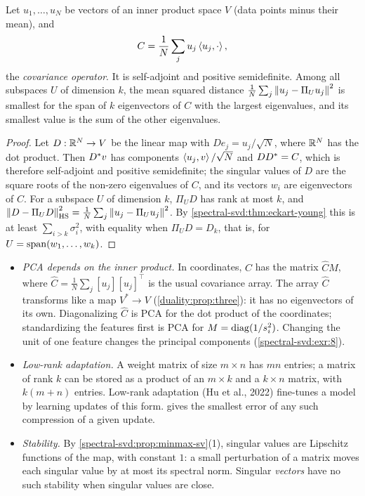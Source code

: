 \begin{notechapter}
\begin{proposition}
\label{spectral-svd:prop:pca}
Let $u_1,\dots,u_N$ be vectors of an inner product space $V$ (data points
minus their mean), and
\[
  C = \frac1N\sum_ju_j\left\langle u_j, \cdot \right\rangle ,
\]
the \emph{covariance operator}. It is self-adjoint and positive
semidefinite. Among all subspaces $U$ of dimension $k$, the mean squared
distance $\frac1N\sum_j\left\|u_j - \Pi_Uu_j\right\|^2$ is smallest for the span of
$k$ eigenvectors of $C$ with the largest eigenvalues, and its smallest
value is the sum of the other eigenvalues.
\end{proposition}

\begin{proof}
Let $D:\mathbb{R}^N\to V$ be the linear map with $De_j = u_j/\sqrt N$, where
$\mathbb{R}^N$ has the dot product. Then $D^{*}v$ has components
$\left\langle u_j, v \right\rangle/\sqrt N$ and $DD^{*} = C$, which is therefore self-adjoint
and positive semidefinite; the singular values of $D$ are the square roots
of the non-zero eigenvalues of $C$, and its vectors $w_i$ are eigenvectors
of $C$. For a subspace $U$ of dimension $k$, $\Pi_UD$ has rank at most
$k$, and
$\left\|D - \Pi_UD\right\|_{\mathrm{HS}}^2 = \frac1N\sum_j\left\|u_j - \Pi_Uu_j\right\|^2$.
By \cref{spectral-svd:thm:eckart-young} this is at least
$\sum_{i > k}\sigma_i^2$, with equality when $\Pi_UD = D_k$, that is, for
$U = \operatorname{span}(w_1,\dots,w_k)$.
\end{proof}

\begin{mlthread}
\begin{itemize}[nosep]
  \item \emph{PCA depends on the inner product.} In coordinates,
        $C$ has the matrix $\hat CM$, where
        $\hat C = \frac1N\sum_j[u_j][u_j]^\top$ is the usual covariance
        array. The array $\hat C$ transforms like a map $V^*\to V$
        (\cref{duality:prop:three}): it has no eigenvectors of its own.
        Diagonalizing $\hat C$ is PCA for the dot product of the
        coordinates; standardizing the features first is PCA for
        $M = \operatorname{diag}(1/s_i^2)$. Changing the unit of one feature changes
        the principal components (\cref{spectral-svd:exr:8}).
  \item \emph{Low-rank adaptation.} A weight matrix of size $m\times n$
        has $mn$ entries; a matrix of rank $k$ can be stored as a product
        of an $m\times k$ and a $k\times n$ matrix, with $k(m + n)$
        entries. Low-rank adaptation (Hu et al., 2022) fine-tunes a model
        by learning updates of this form.
         gives the smallest error of
        any such compression of a given update.
  \item \emph{Stability.} By \cref{spectral-svd:prop:minmax-sv}(1),
        singular values are Lipschitz functions of the map, with constant
        $1$: a small perturbation of a matrix moves each singular value
        by at most its spectral norm. Singular \emph{vectors} have no
        such stability when singular values are close.
\end{itemize}
\end{mlthread}


\end{notechapter}
